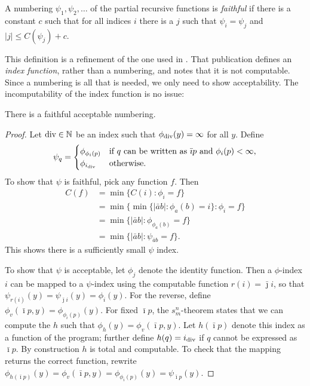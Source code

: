 \documentclass{style/llncs}
\newcommand{\N}{\mathbb N}
\newcommand{\tn}[1]{\textnormal{#1}}
\begin{document}
\begin{definition}\label{def:faithful}
  A numbering $\psi_1,\psi_2,\ldots$ of the partial recursive
  functions is \emph{faithful} if there is a constant $c$ such that
  for all indices $i$ there is a $j$ such that $\psi_i=\psi_j$ and
  $|j|\le C(\psi_j)+c$.
\end{definition}
This definition is a refinement of the one used in \cite{adriaans2012facticity}. That publication defines an \emph{index function}, rather than a numbering, and notes that it is not computable. Since a numbering is all that is needed, we only need to show acceptability. The incomputability of the index function is no issue:
\begin{lemma}
  There is a faithful acceptable numbering.
\end{lemma}
\begin{proof}
Let $\tn{div} \in \N$ be an index such that $\phi_{\tn{div}}(y)=\infty$ for all $y$. Define
  \[\psi_q=\begin{cases}
    \phi_{\phi_i(p)}&\tn{if $q$ can be written as $\bar\imath p$ and $\phi_i(p)<\infty$,}\\
    \phi_{i_\tn{div}}&\tn{otherwise.}\end{cases}
  \]
  To show that $\psi$ is faithful, pick any function $f$. Then
\[\begin{split}
C(f)&=\min\{C(i):\phi_i=f\}\\
&=\min\{\min\{|\bar a b|:\phi_a(b)=i\}:\phi_i=f\}\\
&=\min\{|\bar a b|:\phi_{\phi_a(b)}=f\}\\
&=\min\{|\bar a b|:\psi_{\bar a b}=f\}.
\end{split}\]
This shows there is a sufficiently small $\psi$ index.

To show that $\psi$ is acceptable, let $\phi_j$ denote the identity
function. Then a $\phi$-index $i$ can be mapped to a $\psi$-index
using the computable function $r(i)=\bar\jmath i$, so that
$\psi_{r(i)}(y)=\psi_{\bar\jmath i}(y)=\phi_i(y)$. For the reverse,
define $\phi_v(\bar\imath p, y)=\phi_{\phi_i(p)}(y)$. For fixed
$\bar\imath p$, the 
$s^n_m$-theorem \cite{kleene193notation} states that we can compute the $h$
such that $\phi_h(y)=\phi_v(\bar\imath p,y)$. Let $h(\bar\imath p)$
denote this index as a function of the program; further define
$h(q)=i_\tn{div}$ if $q$ cannot be expressed as $\bar\imath p$. By
construction $h$ is total and computable. To check that the mapping
returns the correct function, rewrite $\phi_{h(\bar\imath
  p)}(y)=\phi_v(\bar\imath p,y)=\phi_{\phi_i(p)}(y)=\psi_{\bar\imath p}(y)$.
\end{proof}
\end{document}
